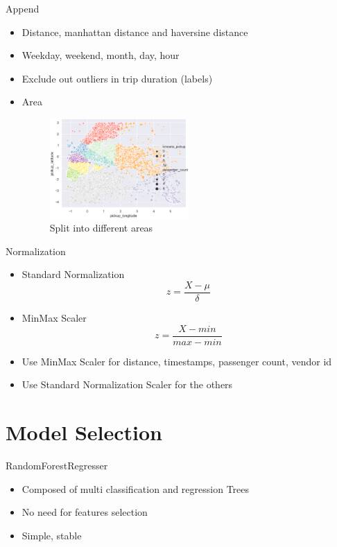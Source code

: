 \documentclass[
 size=12pt,
 paper=smartboard, %
 mode=present, %
 display=slides, %
style=tuliplab,
pauseslide,
fleqn,leqno]{powerdot}
\begin{document}
\begin{slide}{Append}
  \begin{itemize}
    \item Distance, manhattan distance and haversine distance \pause
    \item Weekday, weekend, month, day, hour \pause
    \item Exclude out outliers in trip duration (labels) \pause
    \item Area
    \begin{figure}[h]
      \centering
      \includegraphics[width=0.5\textwidth]{figures2/area.eps}
      \caption{Split into different areas}
      \label{fig:area-geo}
    \end{figure}
  \end{itemize}
\end{slide}


\begin{slide}{Normalization}
  \begin{itemize}
    \item Standard Normalization 
    $$
    z = \frac{X-\mu}{\delta}
    $$
    \pause
    \item MinMax Scaler
    $$
    z = \frac{X-min}{max-min}
    $$
    \pause
    \item Use MinMax Scaler for distance, timestamps, passenger count, vendor id \pause
    \item Use Standard Normalization Scaler for the others \pause
  \end{itemize}
\end{slide}


\section{Model Selection}

\begin{slide}{RandomForestRegresser}
  \begin{itemize}
    \item Composed of multi classification and regression Trees \pause
    \item No need for features selection \pause
    \item Simple, stable
  \end{itemize}
\end{slide}
\end{document}
